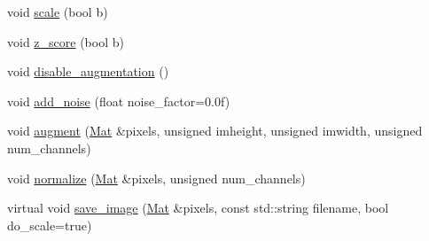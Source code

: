 \begin{DoxyCompactItemize}
\item 
void \hyperlink{classlbann_1_1lbann__image__preprocessor_a977b2fdd417acb1eb37dbea0cfdd4b60}{scale} (bool b)
\item 
void \hyperlink{classlbann_1_1lbann__image__preprocessor_a02cfd4d8c26a317540b587eb52cef0d5}{z\+\_\+score} (bool b)
\item 
void \hyperlink{classlbann_1_1lbann__image__preprocessor_a871cb543ee6c132a76e16045a1a2a9f3}{disable\+\_\+augmentation} ()
\item 
void \hyperlink{classlbann_1_1lbann__image__preprocessor_a1726baf71e931108dc9192539e90c583}{add\+\_\+noise} (float noise\+\_\+factor=0.\+0f)
\item 
void \hyperlink{classlbann_1_1lbann__image__preprocessor_a27cb5182c4f764cbfa4edecbb78ef29d}{augment} (\hyperlink{base_8hpp_a68f11fdc31b62516cb310831bbe54d73}{Mat} \&pixels, unsigned imheight, unsigned imwidth, unsigned num\+\_\+channels)
\item 
void \hyperlink{classlbann_1_1lbann__image__preprocessor_ae370cdc9f776ce8cce94a45cacf47425}{normalize} (\hyperlink{base_8hpp_a68f11fdc31b62516cb310831bbe54d73}{Mat} \&pixels, unsigned num\+\_\+channels)
\item 
virtual void \hyperlink{classlbann_1_1lbann__image__preprocessor_a67b11150501a829125e9c6999781bc67}{save\+\_\+image} (\hyperlink{base_8hpp_a68f11fdc31b62516cb310831bbe54d73}{Mat} \&pixels, const std\+::string filename, bool do\+\_\+scale=true)
\end{DoxyCompactItemize}
